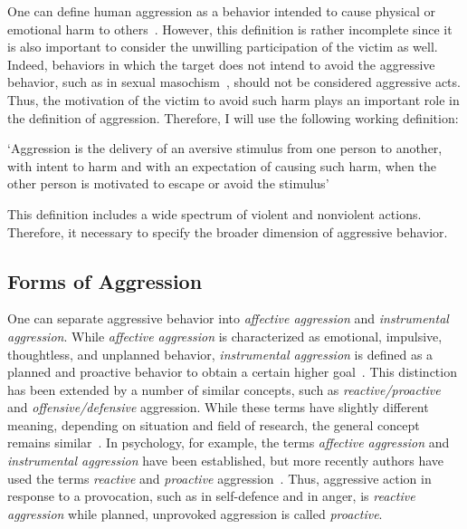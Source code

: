 One can define human aggression as a behavior intended to cause physical or emotional harm to others~\cite{Anderson2002}.
However, this definition is rather incomplete since it is also important to consider the unwilling participation of the victim as well.
Indeed, behaviors in which the target does not intend to avoid the aggressive behavior, such as in sexual masochism~\cite{Berkowitz1993,Baumeister1989,Baron2007,Geen2001}, should not be considered  aggressive acts.
Thus, the motivation of the victim to avoid such harm plays an important role in the definition of aggression.  
Therefore, I will use the following working definition:
\begin{mydef}[Aggression]\label{def:aggression}
	`Aggression is the delivery of an aversive stimulus from one person to another, with intent to harm and with an expectation of causing such harm, when the other person is motivated to escape or avoid the stimulus'~\cite{Geen2001}
\end{mydef}

This definition includes a wide spectrum of violent and nonviolent actions.
Therefore, it necessary to specify the broader dimension of aggressive behavior.

\subsection{Forms of Aggression}
\label{sub:forms_of_aggression}

One can separate aggressive behavior into \textit{affective aggression} and \textit{instrumental aggression}.
While \textit{affective aggression} is characterized as emotional, impulsive, thoughtless, and unplanned behavior, \textit{instrumental aggression} is defined as a planned and proactive behavior to obtain a certain higher goal~\cite{Berkowitz1993,Geen2001}.
This distinction has been extended by a number of similar concepts, such as \textit{reactive/proactive} and \textit{offensive/defensive} aggression.
While these terms have slightly different meaning, depending on situation and field of research, the general concept remains similar~\cite{Geen2001, Blanchard2005b}.
In psychology, for example, the terms \textit{affective aggression} and \textit{instrumental aggression} have been established, but more recently authors have used the terms \textit{reactive} and \textit{proactive} aggression~\cite{Geen2001}.
Thus, aggressive action in response to a provocation, such as in self-defence and in anger, is \textit{reactive aggression} while planned, unprovoked aggression is called \textit{proactive}.

